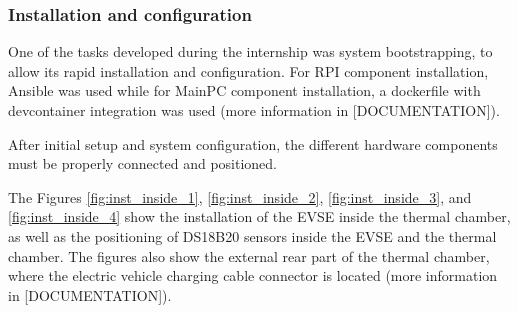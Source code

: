 \subsubsection{Installation and configuration}
One of the tasks developed during the internship was system bootstrapping, to allow its rapid installation and configuration. For RPI component installation, Ansible was used while for MainPC component installation, a dockerfile with devcontainer integration was used (more information in [DOCUMENTATION]).

After initial setup and system configuration, the different hardware components must be properly connected and positioned.

The Figures \ref{fig:inst_inside_1}, \ref{fig:inst_inside_2}, \ref{fig:inst_inside_3}, and \ref{fig:inst_inside_4} show the installation of the EVSE inside the thermal chamber, 
as well as the positioning of DS18B20 sensors inside the EVSE and the thermal chamber. The 
figures also show the external rear part of the thermal chamber, where the electric vehicle 
charging cable connector is located (more information in [DOCUMENTATION]).

